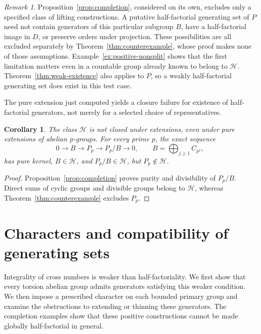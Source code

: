 \documentclass[11pt,reqno]{amsart}
\numberwithin{equation}{section}
\newtheorem{corollary}[theorem]{Corollary}
\theoremstyle{definition}
\theoremstyle{remark}
\newtheorem{remark}[theorem]{Remark}
\newcommand{\HF}{\mathcal H}
\begin{document}
\begin{remark}\label{rem:completion-limit}
Proposition~\ref{prop:completion}, considered on its own, excludes
only a specified class of lifting constructions. A putative
half-factorial generating set of $P$ need not contain generators
of this particular subgroup $B$, have a half-factorial image
in $D$, or preserve orders under projection. These possibilities
are all excluded separately by Theorem~\ref{thm:counterexample},
whose proof makes none of those assumptions. Example~\ref{ex:positive-nonsplit}
shows that the first limitation matters even in a countable group
already known to belong to $\HF$. Theorem~\ref{thm:weak-existence}
also applies to $P$, so a weakly half-factorial generating set does
exist in this test case.
\end{remark}

The pure extension just computed yields a closure failure for
existence of half-factorial generators, not merely for a selected
choice of representatives.

\begin{corollary}\label{cor:pure-extension-failure}
The class $\HF$ is not closed under extensions, even under pure
extensions of abelian $p$-groups. For every prime $p$, the exact
sequence
\[
 0\longrightarrow B\longrightarrow P_p\longrightarrow P_p/B
 \longrightarrow0,\qquad B=\bigoplus_{j\ge1}C_{p^j},
\]
has pure kernel, $B\in\HF$, and $P_p/B\in\HF$, but
$P_p\notin\HF$.
\end{corollary}

\begin{proof}
Proposition~\ref{prop:completion} proves purity and divisibility of
$P_p/B$. Direct sums of cyclic groups and divisible groups belong
to $\HF$, whereas Theorem~\ref{thm:counterexample} excludes $P_p$.
\end{proof}

\section{Characters and compatibility of generating sets}\label{sec:characters}

Integrality of cross numbers is weaker than half-factoriality.
We first show that every torsion abelian group admits generators
satisfying this weaker condition. We then impose a prescribed
character on each bounded primary group and examine the obstructions
to extending or thinning these generators. The completion examples
show that these positive constructions cannot be made globally
half-factorial in general.
\end{document}
